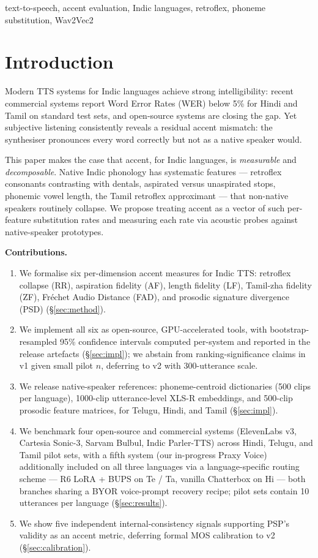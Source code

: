 \documentclass[conference,a4paper]{IEEEtran}
\begin{document}
\begin{IEEEkeywords}
text-to-speech, accent evaluation, Indic languages, retroflex, phoneme substitution, Wav2Vec2
\end{IEEEkeywords}

\section{Introduction}
\label{sec:intro}

Modern TTS systems for Indic languages achieve strong intelligibility: recent commercial systems report Word Error Rates (WER) below 5\% for Hindi and Tamil on standard test sets, and open-source systems are closing the gap. Yet subjective listening consistently reveals a residual accent mismatch: the synthesiser pronounces every word correctly but not as a native speaker would.

This paper makes the case that accent, for Indic languages, is \emph{measurable} and \emph{decomposable}. Native Indic phonology has systematic features --- retroflex consonants contrasting with dentals, aspirated versus unaspirated stops, phonemic vowel length, the Tamil retroflex approximant --- that non-native speakers routinely collapse. We propose treating accent as a vector of such per-feature substitution rates and measuring each rate via acoustic probes against native-speaker prototypes.

\textbf{Contributions.}
\begin{enumerate}
  \item We formalise six per-dimension accent measures for Indic TTS: retroflex collapse (RR), aspiration fidelity (AF), length fidelity (LF), Tamil-zha fidelity (ZF), Fr\'echet Audio Distance (FAD), and prosodic signature divergence (PSD) (§\ref{sec:method}).
  \item We implement all six as open-source, GPU-accelerated tools, with bootstrap-resampled 95\% confidence intervals computed per-system and reported in the release artefacts (§\ref{sec:impl}); we abstain from ranking-significance claims in v1 given small pilot $n$, deferring to v2 with 300-utterance scale.
  \item We release native-speaker references: phoneme-centroid dictionaries (500 clips per language), 1000-clip utterance-level XLS-R embeddings, and 500-clip prosodic feature matrices, for Telugu, Hindi, and Tamil (§\ref{sec:impl}).
  \item We benchmark four open-source and commercial systems (ElevenLabs v3, Cartesia Sonic-3, Sarvam Bulbul, Indic Parler-TTS) across Hindi, Telugu, and Tamil pilot sets, with a fifth system (our in-progress Praxy Voice) additionally included on all three languages via a language-specific routing scheme --- R6 LoRA + BUPS on Te / Ta, vanilla Chatterbox on Hi --- both branches sharing a BYOR voice-prompt recovery recipe; pilot sets contain 10 utterances per language (§\ref{sec:results}).
  \item We show five independent internal-consistency signals supporting PSP's validity as an accent metric, deferring formal MOS calibration to v2 (§\ref{sec:calibration}).
\end{enumerate}
\end{document}

